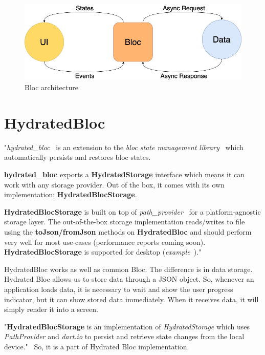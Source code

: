 \begin{figure}
    \centering
    \includegraphics[scale=0.4]{assets/bloc_architecture.png}
    \caption{Bloc architecture~\cite{bloc}}
    \label{fig:bloc-architecture}
\end{figure}

\section{HydratedBloc}\label{sec:hydratedbloc}
"\textit{hydrated\_bloc}~\cite{hydratedBlocPubDev} is an extension to the \textit{bloc state management library}~\cite{bloc} which automatically persists and restores bloc states.

\textbf{hydrated\_bloc} exports a \textbf{HydratedStorage} interface which means it can work with any storage provider.
Out of the box, it comes with its own implementation: \textbf{HydratedBlocStorage}.

\textbf{HydratedBlocStorage} is built on top of \textit{path\_provider}~\cite{pathProvider} for a platform-agnostic storage layer.
The out-of-the-box storage implementation reads/writes to file using the \textbf{toJson/fromJson} methods on \textbf{HydratedBloc} and should perform very well for most use-cases (performance reports coming soon).
\textbf{HydratedBlocStorage} is supported for desktop (\textit{example}~\cite{hydratedBlocExample})."~\cite{hydratedBlocTut}

HydratedBloc works as well as common Bloc.
The difference is in data storage.
Hydrated Bloc allows us to store data through a JSON object.
So, whenever an application loads data, it is necessary to wait and show the user progress indicator, but it can show stored data immediately.
When it receives data, it will simply render it into a screen.

"\textbf{HydratedBlocStorage} is an implementation of \textit{HydratedStorage} which uses \textit{PathProvider} and \textit{dart.io} to persist and retrieve state changes from the local device."~\cite{hydratedBlocStorage}
So, it is a part of Hydrated Bloc implementation.